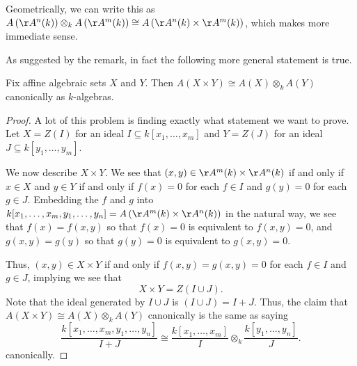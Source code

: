 \begin{remark}
	Geometrically, we can write this as $A\left(\AA^n(k)\right)\otimes_kA\left(\AA^m(k)\right)\cong A\left(\AA^n(k)\times\AA^m(k)\right)$, which makes more immediate sense.
\end{remark}
As suggested by the remark, in fact the following more general statement is true.
\begin{proposition}
	Fix affine algebraic sets $X$ and $Y$. Then $A(X\times Y)\cong A(X)\otimes_kA(Y)$ canonically as $k$-algebras.
\end{proposition}
\begin{proof}
	A lot of this problem is finding exactly what statement we want to prove. Let $X=Z(I)$ for an ideal $I\subseteq k[x_1,\ldots,x_m]$ and $Y=Z(J)$ for an ideal $J\subseteq k[y_1,\ldots,y_m]$.

	We now describe $X\times Y$. We see that $(x,y)\in\AA^m(k)\times\AA^n(k)$ if and only if $x\in X$ and $y\in Y$ if and only if $f(x)=0$ for each $f\in I$ and $g(y)=0$ for each $g\in J.$ Embedding the $f$ and $g$ into $k[x_1,\ldots,x_m,y_1,\ldots,y_n]=A\left(\AA^m(k)\times\AA^n(k)\right)$ in the natural way, we see that $f(x)=f(x,y)$ so that $f(x)=0$ is equivalent to $f(x,y)=0$, and $g(x,y)=g(y)$ so that $g(y)=0$ is equivalent to $g(x,y)=0$.

	Thus, $(x,y)\in X\times Y$ if and only if $f(x,y)=g(x,y)=0$ for each $f\in I$ and $g\in J$, implying we see that
	\[X\times Y=Z(I\cup J).\]
	Note that the ideal generated by $I\cup J$ is $(I\cup J)=I+J$. Thus, the claim that $A(X\times Y)\cong A(X)\otimes_kA(Y)$ canonically is the same as saying
	\[\frac{k[x_1,\ldots,x_m,y_1,\ldots,y_n]}{I+J}\cong\frac{k[x_1,\ldots,x_m]}{I}\otimes_k\frac{k[y_1,\ldots,y_n]}{J}.\]
	canonically.
	

\end{proof}
